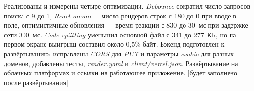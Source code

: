 \documentclass{stp}
\newcommand{\en}[1]{\textit{#1}}
\begin{document}
Реализованы и измерены четыре оптимизации. \en{Debounce} сократил число
запросов поиска с 9 до 1, \en{React.memo} --- число рендеров строк с 180 до 0
при вводе в поле, оптимистичные обновления --- время реакции с 830 до 30~мс
при задержке сети 300~мс. \en{Code splitting} уменьшил основной файл с 341 до
277~КБ, но на первом экране выигрыш составил около 0,5\% байт. Бэкенд
подготовлен к развёртыванию: исправлены \en{CORS} для \en{PUT} и параметры
\en{cookie} для разных доменов, добавлены тесты, \en{render.yaml} и
\en{client/vercel.json}. Развёртывание на облачных платформах и ссылки на
работающее приложение: [будет заполнено после развёртывания].
\end{document}
